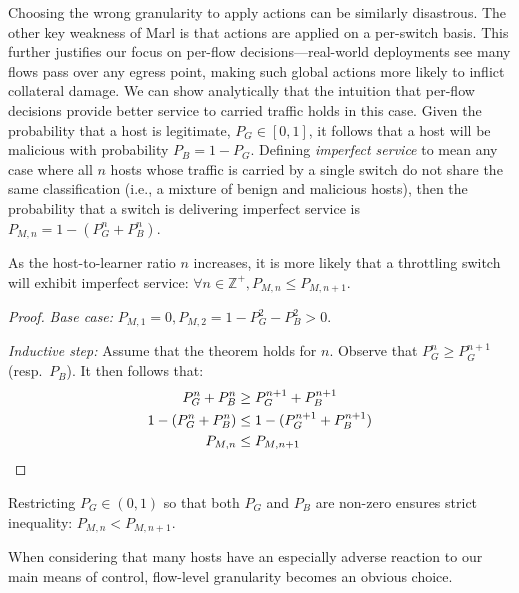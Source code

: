 Choosing the wrong granularity to apply actions can be similarly disastrous.
The other key weakness of Marl is that actions are applied on a per-switch basis.
This further justifies our focus on per-flow decisions---real-world deployments see many flows pass over any egress point, making such global actions more likely to inflict collateral damage.
We can show analytically that the intuition that per-flow decisions provide better service to carried traffic holds in this case.
Given the probability that a host is legitimate, $P_G \in [0,1]$, it follows that a host will be malicious with probability $P_B = 1 - P_G$.
Defining \emph{imperfect service} to mean any case where all $n$ hosts whose traffic is carried by a single switch do not share the same classification (i.e., a mixture of benign and malicious hosts), then the probability that a switch is delivering imperfect service is $P_{M,n} = 1 - (P_G^n + P_B^n)$.
\begin{thm}
	As the host-to-learner ratio $n$ increases, it is more likely that a throttling switch will exhibit imperfect service: $\forall n \in \mathbb{Z}^{+}, P_{M,n} \le P_{M,n+1}$.
\end{thm}
\begin{proof}
	\emph{Base case:} $P_{M,1}=0, P_{M,2} = 1 - P_G^2 - P_B^2 > 0$.
	
	\emph{Inductive step:} Assume that the theorem holds for $n$. Observe that $P_G^n \ge P_G^{n+1}$ (resp.\ $P_B$). It then follows that:
	\begin{align*}
	P_G^n + P_B^n &\ge P_G^{n+1} + P_B^{n+1}\\
	1 - (P_G^n + P_B^n) &\le 1 - (P_G^{n+1} + P_B^{n+1})\\
	P_{M,n} &\le P_{M,n+1} \qedhere
	\end{align*}
\end{proof}
\begin{corr}
	Restricting $P_G \in (0,1)$ so that both $P_G$ and $P_B$ are non-zero ensures strict inequality: $P_{M,n} < P_{M,n+1}$.
\end{corr}
When considering that many hosts have an especially adverse reaction to our main means of control, flow-level granularity becomes an obvious choice.

